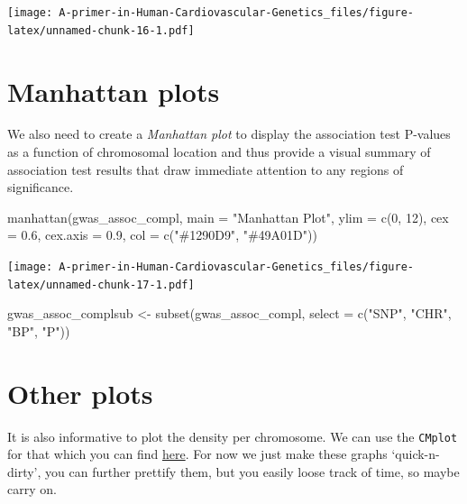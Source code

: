 \documentclass[
]{book}
\newenvironment{Shaded}{\begin{snugshade}}{\end{snugshade}}
\newcommand{\AttributeTok}[1]{\textcolor[rgb]{0.77,0.63,0.00}{#1}}
\newcommand{\DecValTok}[1]{\textcolor[rgb]{0.00,0.00,0.81}{#1}}
\newcommand{\FloatTok}[1]{\textcolor[rgb]{0.00,0.00,0.81}{#1}}
\newcommand{\FunctionTok}[1]{\textcolor[rgb]{0.00,0.00,0.00}{#1}}
\newcommand{\NormalTok}[1]{#1}
\newcommand{\OtherTok}[1]{\textcolor[rgb]{0.56,0.35,0.01}{#1}}
\newcommand{\StringTok}[1]{\textcolor[rgb]{0.31,0.60,0.02}{#1}}
\begin{document}
\texttt{[image: A-primer-in-Human-Cardiovascular-Genetics\_files/figure-latex/unnamed-chunk-16-1.pdf]}

\hypertarget{manhattan-plots}{%
\section{Manhattan plots}\label{manhattan-plots}}

We also need to create a \emph{Manhattan plot} to display the association test P-values as a function of chromosomal location and thus provide a visual summary of association test results that draw immediate attention to any regions of significance.

\begin{Shaded}
\begin{Highlighting}[]
\FunctionTok{manhattan}\NormalTok{(gwas\_assoc\_compl, }\AttributeTok{main =} \StringTok{"Manhattan Plot"}\NormalTok{,}
          \AttributeTok{ylim =} \FunctionTok{c}\NormalTok{(}\DecValTok{0}\NormalTok{, }\DecValTok{12}\NormalTok{),}
          \AttributeTok{cex =} \FloatTok{0.6}\NormalTok{, }\AttributeTok{cex.axis =} \FloatTok{0.9}\NormalTok{,}
          \AttributeTok{col =} \FunctionTok{c}\NormalTok{(}\StringTok{"\#1290D9"}\NormalTok{, }\StringTok{"\#49A01D"}\NormalTok{))}
\end{Highlighting}
\end{Shaded}

\texttt{[image: A-primer-in-Human-Cardiovascular-Genetics\_files/figure-latex/unnamed-chunk-17-1.pdf]}

\begin{Shaded}
\begin{Highlighting}[]
\NormalTok{gwas\_assoc\_complsub }\OtherTok{\textless{}{-}} \FunctionTok{subset}\NormalTok{(gwas\_assoc\_compl, }\AttributeTok{select =} \FunctionTok{c}\NormalTok{(}\StringTok{"SNP"}\NormalTok{, }\StringTok{"CHR"}\NormalTok{, }\StringTok{"BP"}\NormalTok{, }\StringTok{"P"}\NormalTok{))}
\end{Highlighting}
\end{Shaded}

\hypertarget{other-plots}{%
\section{Other plots}\label{other-plots}}

It is also informative to plot the density per chromosome. We can use the \texttt{CMplot} for that which you can find \href{https://github.com/YinLiLin/R-CMplot}{here}. For now we just make these graphs `quick-n-dirty', you can further prettify them, but you easily loose track of time, so maybe carry on.
\end{document}
